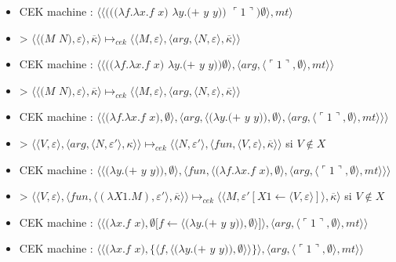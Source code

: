 \documentclass[10pt,a4paper]{article}
\begin{document}
					\begin{itemize}
						\item[] CEK machine : $\langle\langle(((\lambda f.\lambda x.f$ $x)$ $\lambda y.(+$ $y$ $y))$ $\ulcorner 1\urcorner)\emptyset\rangle,mt\rangle$
						\item[] > $\langle\langle(M$ $N),\varepsilon\rangle,\overline{\kappa}\rangle \longmapsto_{cek} \langle \langle M,\varepsilon\rangle,\langle arg,\langle N,\varepsilon\rangle,\overline{\kappa}\rangle\rangle$
						\item[] CEK machine : $\langle\langle((\lambda f.\lambda x.f$ $x)$ $\lambda y.(+$ $y$ $y))\emptyset\rangle,\langle arg,\langle\ulcorner 1\urcorner,\emptyset\rangle,mt\rangle\rangle$
						\item[] > $\langle\langle(M$ $N),\varepsilon\rangle,\overline{\kappa}\rangle \longmapsto_{cek} \langle \langle M,\varepsilon\rangle,\langle arg,\langle N,\varepsilon\rangle,\overline{\kappa}\rangle\rangle$
						\item[] CEK machine : $\langle\langle(\lambda f.\lambda x.f$ $x),\emptyset\rangle,\langle arg,\langle(\lambda y.(+$ $y$ $y)),\emptyset\rangle,\langle arg,\langle\ulcorner 1\urcorner,\emptyset\rangle,mt\rangle\rangle\rangle$
						\item[] >  $\langle \langle V,\varepsilon\rangle,\langle arg,\langle N,\varepsilon'\rangle,\kappa\rangle\rangle \longmapsto_{cek} \langle \langle N,\varepsilon'\rangle,\langle fun,\langle V,\varepsilon\rangle,\overline{\kappa}\rangle\rangle$ si $V \notin X$
						\item[] CEK machine : $\langle\langle(\lambda y.(+$ $y$ $y)),\emptyset\rangle,\langle fun,\langle(\lambda f.\lambda x.f$ $x),\emptyset\rangle,\langle arg,\langle\ulcorner 1\urcorner,\emptyset\rangle,mt\rangle\rangle\rangle$
						\item[] > $\langle\langle V,\varepsilon\rangle,\langle fun,\langle (\lambda X1.M),\varepsilon'\rangle,\overline{\kappa} \rangle \rangle \longmapsto_{cek} \langle \langle M,\varepsilon'[X1 \leftarrow \langle V,\varepsilon\rangle]\rangle,\overline{\kappa}\rangle$ si $V \notin X$
						\item[] CEK machine : $\langle\langle(\lambda x.f$ $x),\emptyset[f \leftarrow \langle(\lambda y.(+$ $y$ $y)),\emptyset\rangle]\rangle,\langle arg,\langle\ulcorner 1\urcorner,\emptyset\rangle,mt\rangle\rangle$
						\item[] CEK machine : $\langle\langle(\lambda x.f$ $x),\{\langle f,\langle(\lambda y.(+$ $y$ $y)),\emptyset\rangle\rangle\}\rangle,\langle arg,\langle\ulcorner 1\urcorner,\emptyset\rangle,mt\rangle\rangle$

\end{itemize}
\end{document}
